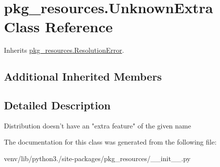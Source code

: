 \hypertarget{classpkg__resources_1_1_unknown_extra}{}\section{pkg\+\_\+resources.\+Unknown\+Extra Class Reference}
\label{classpkg__resources_1_1_unknown_extra}


Inherits \hyperlink{classpkg__resources_1_1_resolution_error}{pkg\+\_\+resources.\+Resolution\+Error}.

\subsection*{Additional Inherited Members}


\subsection{Detailed Description}
\begin{DoxyVerb}Distribution doesn't have an "extra feature" of the given name\end{DoxyVerb}
 

The documentation for this class was generated from the following file\+:\begin{DoxyCompactItemize}
\item 
venv/lib/python3./site-\/packages/pkg\+\_\+resources/\+\_\+\+\_\+init\+\_\+\+\_\+.\+py\end{DoxyCompactItemize}

